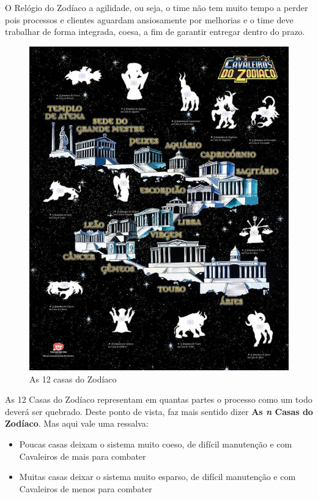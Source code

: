 O Relógio do Zodíaco a agilidade, ou seja, o time não tem muito tempo a perder pois processos e clientes aguardam ansiosamente por melhorias e o time deve trabalhar de forma integrada, coesa, a fim de garantir entregar dentro do prazo.

\begin{figure}[H]
    \centering
    \includegraphics[scale=0.55,keepaspectratio=true]{images/08.jpg}
    \caption{As 12 casas do Zodíaco}
\end{figure}

As 12 Casas do Zodíaco representam em quantas partes o processo como um todo deverá ser quebrado. Deste ponto de vista, faz mais sentido dizer \textbf{As \emph{n} Casas do Zodíaco}. Mas aqui vale uma ressalva: 
\begin{itemize}
    \item Poucas casas deixam o sistema muito coeso, de difícil manutenção e com Cavaleiros de mais para combater
    \item Muitas casas deixar o sistema muito esparso, de difícil manutenção e com Cavaleiros de menos para combater
\end{itemize}

